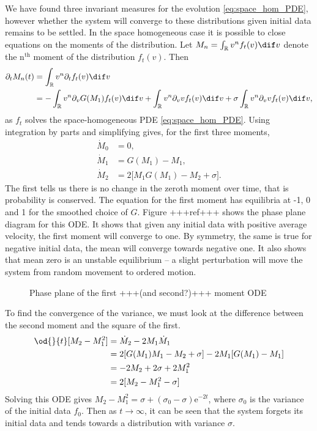 \documentclass[11pt, a4paper, draft]{article}
\renewcommand{\R}{\mathbb{R}}
\begin{document}
        We have found three invariant measures for the evolution \eqref{eq:space_hom_PDE}, however whether the system will converge to these distributions given initial data remains to be settled. In the space homogeneous case it is possible to close equations on the moments of the distribution. Let $M_n = \int_\R v^n f_t(v) \dif v$ denote the n$^\text{th}$ moment of the distribution $f_t(v)$. Then
        \begin{align*}
            \partial_t M_n(t) &= \int_{\R}v^n \partial_t  f_t(v) \dif v\\
            &= - \int_{\R}v^n \partial_v G(M_1)f_t(v) \dif v + \int_{\R}v^n \partial_v vf_t(v) \dif v + \sigma \int_{\R}v^n \partial_vv f_t(v) \dif v,
        \end{align*}
        as $f_t$ solves the space-homogeneous PDE \eqref{eq:space_hom_PDE}. Using integration by parts and simplifying gives, for the first three moments,
        \begin{align*}
            \dot{M}_0 &= 0,\\
            \dot{M}_1 &= G(M_1) - M_1,\\
            \dot{M}_2 &= 2\lbrack M_1G(M_1) - M_2 + \sigma\rbrack.
        \end{align*}
        The first tells us there is no change in the zeroth moment over time, that is probability is conserved. The equation for the first moment has equilibria at -1, 0 and 1 for the smoothed choice of $G$. Figure +++ref+++ shows the phase plane diagram for this ODE. It shows that given any initial data with positive average velocity, the first moment will converge to one. By symmetry, the same is true for negative initial data, the mean will converge towards negative one. It also shows that mean zero is an unstable equilibrium -- a slight perturbation will move the system from random movement to ordered motion.
        \begin{figure}
            \centering
            \caption{Phase plane of the first  +++(and second?)+++ moment ODE}
            \label{fig:M1_phase}
        \end{figure}
        To find the convergence of the variance, we must look at the difference between the second moment and the square of the first.
        \begin{align*}
            \od{}{t}\lbrack M_2 - M_1^2\rbrack &= \dot{M}_2 - 2M_1\dot{M}_1\\
            &= 2\lbrack G(M_1)M_1 - M_2 +\sigma\rbrack - 2M_1\lbrack G(M_1) - M_1\rbrack\\
            &= -2M_2 +2\sigma + 2M_1^2\\
            &= 2\lbrack M_2 - M_1^2 -\sigma\rbrack             
        \end{align*}
        Solving this ODE gives $M_2-M_1^2 = \sigma +(\sigma_0-\sigma)\mathrm{e}^{-2t}$, where $\sigma_0$ is the variance of the initial data $f_0$. Then as $t \to \infty$, it can be seen that the system forgets its initial data and tends towards a distribution with variance $\sigma$.
        
\end{document}

